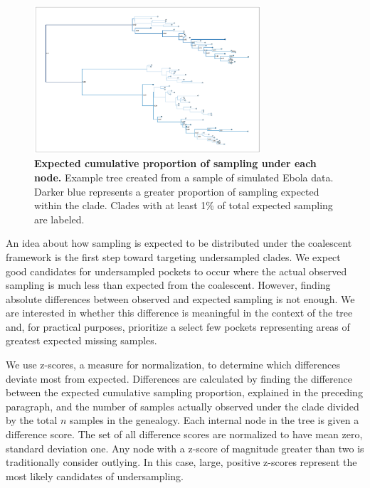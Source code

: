\documentclass[11pt,oneside,letterpaper]{article}
\newcommand\tab[1][1cm]{\hspace*{#1}}
\begin{document}
\begin{figure}[h]
 \centering
	\includegraphics[width=0.75\textwidth]{figures/cumulative-clade-prop}
	\caption{\textbf{Expected cumulative proportion of sampling under each node.}
	Example tree created from a sample of simulated Ebola data. Darker blue represents a greater proportion of sampling expected within the clade. Clades with at least 1\% of total expected sampling are labeled.
	}
	\label{F-cumulative-node-prob}
\end{figure}

\tab An idea about how sampling is expected to be distributed under the coalescent framework is the first step toward targeting undersampled clades. We expect good candidates for undersampled pockets to occur where the actual observed sampling is much less than expected from the coalescent. However, finding absolute differences between observed and expected sampling is not enough. We are interested in whether this difference is meaningful in the context of the tree and, for practical purposes, prioritize a select few pockets representing areas of greatest expected missing samples. 

\tab We use z-scores, a measure for normalization, to determine which differences deviate most from expected. Differences are calculated by finding the difference between the expected cumulative sampling proportion, explained in the preceding paragraph, and the number of samples actually observed under the clade divided by the total $n$ samples in the genealogy. Each internal node in the tree is given a difference score. The set of all difference scores are normalized to have mean zero, standard deviation one. Any node with a z-score of magnitude greater than two is traditionally consider outlying. In this case, large, positive z-scores represent the most likely candidates of undersampling.
\end{document}
